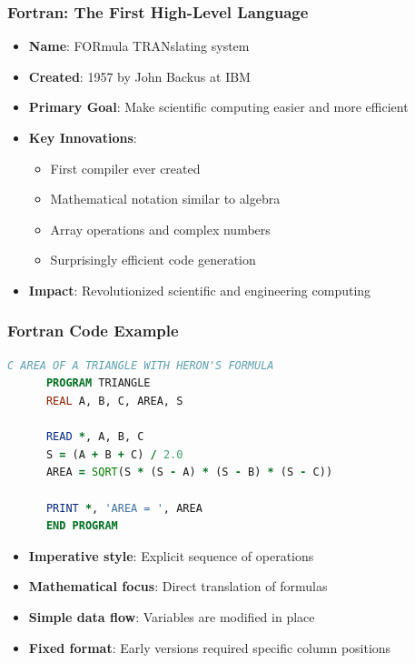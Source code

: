 \documentclass{beamer}
\begin{document}
\begin{frame}[t]
\frametitle{Fortran: The First High-Level Language}
\begin{itemize}
    \item \textbf{Name}: FORmula TRANslating system
    \item \textbf{Created}: 1957 by John Backus at IBM
    \item \textbf{Primary Goal}: Make scientific computing easier and more efficient
    \item \textbf{Key Innovations}:
    \begin{itemize}
        \item First compiler ever created
        \item Mathematical notation similar to algebra
        \item Array operations and complex numbers
        \item Surprisingly efficient code generation
    \end{itemize}
    \item \textbf{Impact}: Revolutionized scientific and engineering computing
\end{itemize}

\end{frame}

\begin{frame}[fragile,t]
\frametitle{Fortran Code Example}
\scriptsize
\begin{lstlisting}[language=Fortran, caption=Fortran 77 Style]
C AREA OF A TRIANGLE WITH HERON'S FORMULA
      PROGRAM TRIANGLE
      REAL A, B, C, AREA, S
      
      READ *, A, B, C
      S = (A + B + C) / 2.0
      AREA = SQRT(S * (S - A) * (S - B) * (S - C))
      
      PRINT *, 'AREA = ', AREA
      END PROGRAM
\end{lstlisting}

\begin{itemize}
    \item \textbf{Imperative style}: Explicit sequence of operations
    \item \textbf{Mathematical focus}: Direct translation of formulas
    \item \textbf{Simple data flow}: Variables are modified in place
    \item \textbf{Fixed format}: Early versions required specific column positions
\end{itemize}
\end{frame}
\end{document}
